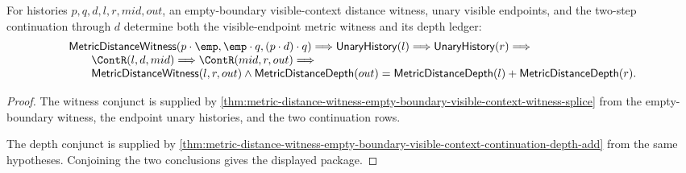 \begin{theorem}
\label{thm:metric-distance-witness-empty-boundary-visible-context-continuation-witness-depth}
For histories $p,q,d,l,r,mid,out$, an empty-boundary visible-context distance
witness, unary visible endpoints, and the two-step continuation through $d$
determine both the visible-endpoint metric witness and its depth ledger:
$$
\begin{array}{l}
\mathsf{MetricDistanceWitness}(p\cdot\emp,\emp\cdot q,(p\cdot d)\cdot q)
\Longrightarrow
\mathsf{UnaryHistory}(l)\Longrightarrow\mathsf{UnaryHistory}(r)\Longrightarrow\\
\qquad
\ContR(l,d,mid)\Longrightarrow\ContR(mid,r,out)\Longrightarrow\\
\qquad
\mathsf{MetricDistanceWitness}(l,r,out)\wedge
\mathsf{MetricDistanceDepth}(out)=
\mathsf{MetricDistanceDepth}(l)+\mathsf{MetricDistanceDepth}(r).
\end{array}
$$
\end{theorem}
\begin{proof}
The witness conjunct is supplied by
\autoref{thm:metric-distance-witness-empty-boundary-visible-context-witness-splice}
from the empty-boundary witness, the endpoint unary histories, and the two
continuation rows.

The depth conjunct is supplied by
\autoref{thm:metric-distance-witness-empty-boundary-visible-context-continuation-depth-add}
from the same hypotheses. Conjoining the two conclusions gives the displayed
package.
\end{proof}

